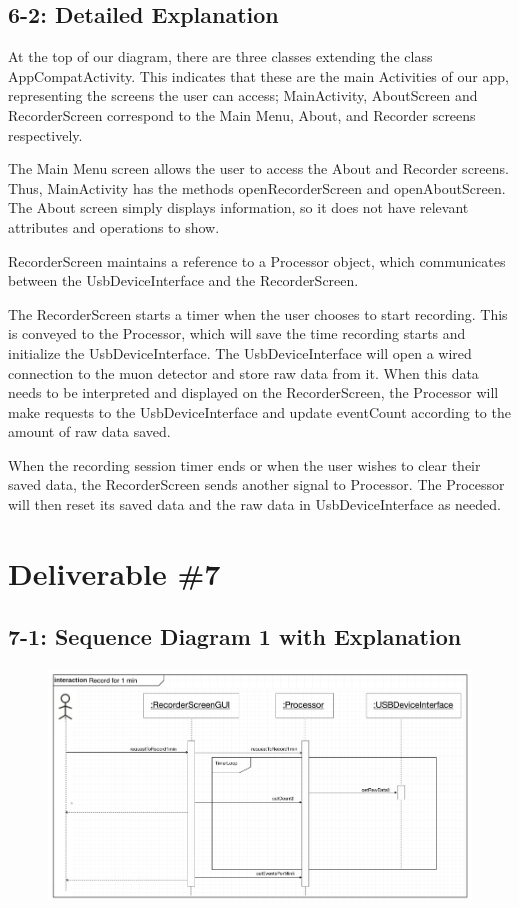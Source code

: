 \documentclass[11pt,a4paper]{article}
\begin{document}
\subsection*{6-2: Detailed Explanation}

At the top of our diagram, there are three classes extending the class AppCompatActivity. This indicates that these are the main Activities of our app, representing the screens the user can access; MainActivity, AboutScreen and RecorderScreen correspond to the Main Menu, About, and Recorder screens respectively.

The Main Menu screen allows the user to access the About and Recorder screens. Thus, MainActivity has the methods openRecorderScreen and openAboutScreen. The About screen simply displays information, so it does not have relevant attributes and operations to show.

RecorderScreen maintains a reference to a Processor object, which communicates between the UsbDeviceInterface and the RecorderScreen.

The RecorderScreen starts a timer when the user chooses to start recording. This is conveyed to the Processor, which will save the time recording starts and initialize the UsbDeviceInterface. The UsbDeviceInterface will open a wired connection to the muon detector and store raw data from it. When this data needs to be interpreted and displayed on the RecorderScreen, the Processor will make requests to the UsbDeviceInterface and update eventCount according to the amount of raw data saved.

When the recording session timer ends or when the user wishes to clear their saved data, the RecorderScreen sends another signal to Processor. The Processor will then reset its saved data and the raw data in UsbDeviceInterface as needed.


\newpage

\section*{Deliverable \#7}

\subsection*{7-1: Sequence Diagram 1 with Explanation}

\begin{figure}[h] \centering
	\includegraphics[width=1.08\textwidth]{sequence1.png}
\end{figure}
\end{document}
